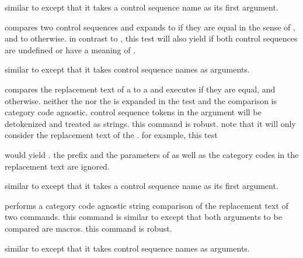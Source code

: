 \begin{ltxsyntax}

similar to  except that it takes a control sequence name as its first argument.


compares two control sequences and expands to  if they are equal in the sense of , and to  otherwise. in contrast to , this test will also yield  if both control sequences are undefined or have a meaning of .


similar to  except that it takes control sequence names as arguments.


compares the replacement text of a  to a  and executes  if they are equal, and  otherwise. neither the  nor the  is expanded in the test and the comparison is category code agnostic. control sequence tokens in the  argument will be detokenized and treated as strings. this command is robust. note that it will only consider the replacement text of the . for example, this test

%
would yield . the prefix and the parameters of  as well as the category codes in the replacement text are ignored.


similar to  except that it takes a control sequence name as its first argument.


performs a category code agnostic string comparison of the replacement text of two commands. this command is similar to  except that both arguments to be compared are macros. this command is robust.


similar to  except that it takes control sequence names as arguments.

\end{ltxsyntax}


